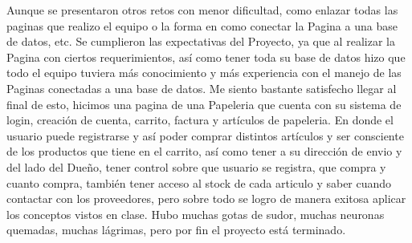 \documentclass[letterpaper,12pt]{article}
\begin{document}
\begin{itemize}
		Aunque se presentaron otros retos con menor dificultad, como enlazar todas las paginas que realizo el equipo o la forma en como conectar la Pagina a una base de datos, etc. Se cumplieron las expectativas del Proyecto, ya que al realizar la Pagina con ciertos requerimientos, así como tener toda su base de datos hizo que todo el equipo tuviera más conocimiento y más experiencia con el manejo de las Paginas conectadas a una base de datos.
		Me siento bastante satisfecho llegar al final de esto, hicimos una pagina de una Papeleria que cuenta con su sistema de login, creación de cuenta, carrito, factura y artículos de papeleria. En donde el usuario puede registrarse y así poder comprar distintos artículos y ser consciente de los productos que tiene en el carrito, así como tener a su dirección de envio y del lado del Dueño, tener control sobre que usuario se registra, que compra y cuanto compra, también tener acceso al stock de cada articulo y saber cuando contactar con los proveedores, pero sobre todo se logro de manera exitosa aplicar los conceptos vistos en clase. 
		Hubo muchas gotas de sudor, muchas neuronas quemadas, muchas lágrimas, pero por fin el proyecto está terminado.
	\end{itemize}
	
\end{document}

